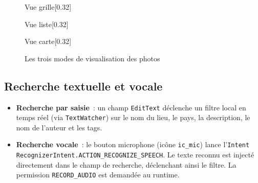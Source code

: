 \documentclass[12pt, a4paper, openany]{report}
\begin{document}
\begin{figure}[H]
  \centering
  \begin{subcaptionbox}{Vue grille\label{fig:home_grid}}[0.32\textwidth]
  \end{subcaptionbox}
  \hfill
  \begin{subcaptionbox}{Vue liste\label{fig:home_list}}[0.32\textwidth]
  \end{subcaptionbox}
  \hfill
  \begin{subcaptionbox}{Vue carte\label{fig:home_map}}[0.32\textwidth]
  \end{subcaptionbox}
  \caption{Les trois modes de visualisation des photos}
  \label{fig:home_views}
\end{figure}

\subsection{Recherche textuelle et vocale}

\begin{itemize}
  \item \textbf{Recherche par saisie}~: un champ \texttt{EditText} déclenche un filtre
        local en temps réel (via \texttt{TextWatcher}) sur le nom du lieu, le pays, la
        description, le nom de l'auteur et les tags.
  \item \textbf{Recherche vocale}~: le bouton microphone (icône \texttt{ic\_mic}) lance
        l'\texttt{Intent} \texttt{RecognizerIntent.ACTION\_RECOGNIZE\_SPEECH}. Le texte
        reconnu est injecté directement dans le champ de recherche, déclenchant ainsi le
        filtre. La permission \texttt{RECORD\_AUDIO} est demandée au runtime.
\end{itemize}
\end{document}
